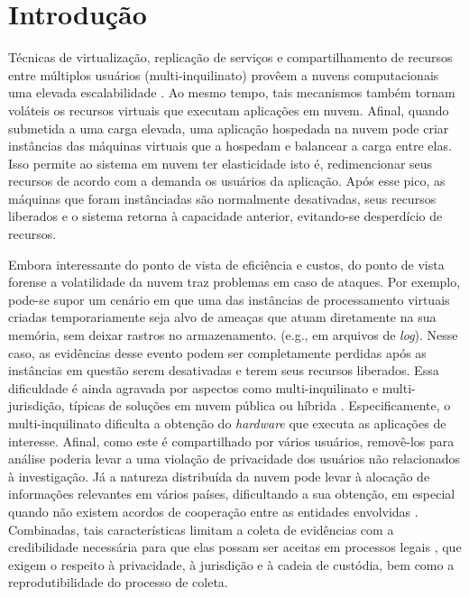 \chapter{Introdução}
\label{chp:intro}

%
Técnicas de virtualização, replicação de serviços e compartilhamento de recursos entre múltiplos usuários (multi-inquilinato) provêem a nuvens computacionais uma elevada escalabilidade \cite{MorsyCloudSecurity:2010}.
%
Ao mesmo tempo, tais mecanismos também tornam voláteis os recursos virtuais que executam aplicações em nuvem.
%
Afinal, quando submetida a uma carga elevada, uma aplicação hospedada na nuvem pode criar instâncias das máquinas virtuais que a hospedam e balancear a carga entre elas.
%
Isso permite ao sistema em nuvem ter elasticidade isto é, redimencionar seus recursos de acordo com a demanda os usuários da aplicação. 
%
Após esse pico, as máquinas que foram instânciadas são normalmente desativadas, seus recursos liberados e o sistema retorna à capacidade anterior, evitando-se desperdício de recursos.


%
Embora interessante do ponto de vista de eficiência e custos, do ponto de vista forense a volatilidade da nuvem traz problemas em caso de ataques.
%
Por exemplo, pode-se supor um cenário em que uma das instâncias de processamento virtuais criadas temporariamente seja alvo de ameaças que atuam diretamente na sua memória, sem deixar rastros no armazenamento. (e.g., em arquivos de \textit{log}).
%
Nesse caso, as evidências desse evento podem ser completamente perdidas após as instâncias em questão serem desativadas e terem seus recursos liberados.
%
Essa dificuldade é ainda agravada por aspectos como multi-inquilinato e multi-jurisdição, típicas de soluções em nuvem pública ou híbrida \cite{BashAdvInForensics:2015}.
%
Especificamente, o multi-inquilinato dificulta a obtenção do \textit{hardware} que executa as aplicações de interesse.
%
Afinal, como este é compartilhado por vários usuários, removê-los para análise poderia levar a uma violação de privacidade dos usuários não relacionados à investigação. 
%
Já a natureza distribuída da nuvem pode levar à alocação de informações relevantes em vários países, dificultando a sua obtenção, em especial quando não existem acordos de cooperação entre as entidades envolvidas \cite{DykstraAcquiringForIAAS:2012}.
%
Combinadas, tais características limitam a coleta de evidências com a credibilidade necessária para que elas possam ser aceitas em processos legais \cite{RahmanLiveForensicsTechniques:2015}, que exigem o respeito à privacidade, à jurisdição e à cadeia de custódia, bem como a reprodutibilidade do processo de coleta.

